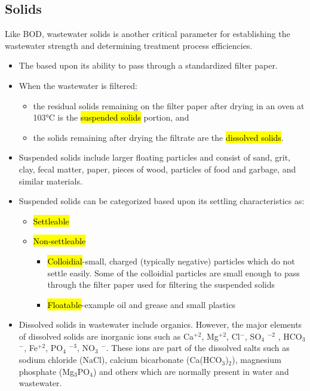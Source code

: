\documentclass{article}
\begin{document}
\subsection{Solids}
		Like BOD, wastewater solids is another critical parameter for establishing the wastewater strength and determining treatment process efficiencies. 
		\begin{itemize}
			\item The  based upon its ability to pass through a standardized filter paper.
			\item When the wastewater is filtered:
			      \begin{itemize}
			      	\item the residual solids remaining on the filter paper after drying in an oven at 103\si{\degree}C is the \hl{suspended solids} portion, and 
			      	\item the solids remaining after drying the filtrate are the \hl{dissolved solids}.
			      \end{itemize}
			\item Suspended solids include larger floating particles and consist of sand, grit, clay, fecal matter, paper, pieces of wood, particles of food and garbage, and similar materials.
			\item Suspended solids can be categorized based upon its settling characteristics as:
			      \begin{itemize}
			      	\item \hl{Settleable}
			      	\item \hl{Non-settleable}
			      	      \begin{itemize}
			      	      	\item \hl{Colloidial}-small, charged (typically negative) particles which do not settle easily.  Some of the colloidial particles are small enough to pass through the filter paper used for filtering the suspended solids
			      	      	\item \hl{Floatable}-example oil and grease and small plastics
			      	      \end{itemize}
			      \end{itemize}
			\item Dissolved solids in wastewater include organics.  However, the major elements of dissolved solids are inorganic ions such as Ca$^{+2}$, Mg$^{+2}$, Cl$^-$, SO$_4$ $^{-2}$ , HCO$_3$ $^-$, Fe$^{+2}$, PO$_4$ $^{-3}$, NO$_3$ $^-$.  These ions are part of the dissolved salts such as sodium chloride (NaCl), calcium bicarbonate (Ca(HCO$_3$)$_2$), magnesium phosphate (Mg$_3$PO$_4$) and others which are normally present in water and wastewater. 

\end{itemize}
\end{document}
